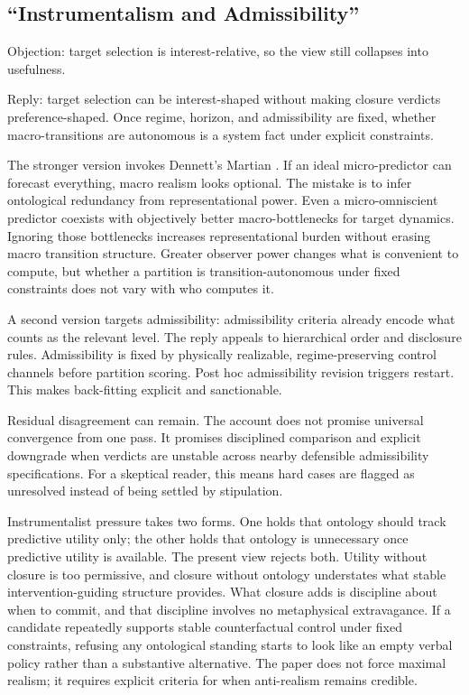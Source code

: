 \subsection{``Instrumentalism and
	Admissibility''}\label{instrumentalism-and-admissibility}

Objection: target selection is interest-relative, so the view still
collapses into usefulness.

Reply: target selection can be interest-shaped without making closure
verdicts preference-shaped. Once regime, horizon, and admissibility are
fixed, whether macro-transitions are autonomous is a system fact under
explicit constraints.

The stronger version invokes Dennett's Martian \citep[p.~42]{dennett1991}. If an ideal
micro-predictor can forecast everything, macro realism looks optional.
The mistake is to infer ontological redundancy from representational
power. Even a micro-omniscient predictor coexists with objectively
better macro-bottlenecks for target dynamics. Ignoring those
bottlenecks increases representational burden without erasing macro
transition structure. Greater observer power changes what is convenient
to compute, but whether a partition is transition-autonomous under fixed
constraints does not vary with who computes it.

A second version targets admissibility: admissibility criteria already
encode what counts as the relevant level. The reply appeals to
hierarchical order and disclosure rules. Admissibility is fixed
by physically realizable, regime-preserving control channels before
partition scoring. Post hoc admissibility revision triggers restart.
This makes back-fitting explicit and sanctionable.

Residual disagreement can remain. The account does not promise
universal convergence from one pass. It promises disciplined comparison
and explicit downgrade when verdicts are unstable across nearby
defensible admissibility specifications. For a skeptical reader, this
means hard cases are flagged as unresolved instead of being settled by
stipulation.

Instrumentalist pressure takes two forms. One holds that ontology should
track predictive utility only; the other holds that ontology is
unnecessary once predictive utility is available. The present view
rejects both. Utility without closure is too permissive, and closure
without ontology understates what stable intervention-guiding structure
provides. What closure adds is discipline about when to commit, and that
discipline involves no metaphysical extravagance. If a candidate
repeatedly supports stable counterfactual control under fixed
constraints, refusing any ontological standing starts to look like an
empty verbal policy rather than a substantive alternative. The paper
does not force maximal realism; it requires explicit criteria for when
anti-realism remains credible.

